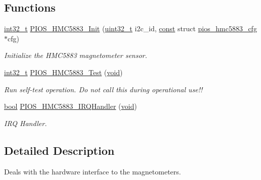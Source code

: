 \subsection*{Functions}
\begin{DoxyCompactItemize}
\item 
\hyperlink{group___n_a_m_e_gafd12020da5a235dfcf0c3c748fb5baed}{int32\-\_\-t} \hyperlink{group___p_i_o_s___h_m_c5883_ga2de33c0ac02b42cb114d9af689101498}{P\-I\-O\-S\-\_\-\-H\-M\-C5883\-\_\-\-Init} (\hyperlink{stdint_8h_a435d1572bf3f880d55459d9805097f62}{uint32\-\_\-t} i2c\-\_\-id, \hyperlink{group___n_a_m_e_ga7ae6d0e43244213b34de2c2b9aa30da6}{const} struct \hyperlink{structpios__hmc5883__cfg}{pios\-\_\-hmc5883\-\_\-cfg} $\ast$cfg)
\begin{DoxyCompactList}\small\item\em Initialize the H\-M\-C5883 magnetometer sensor. \end{DoxyCompactList}\item 
\hyperlink{group___n_a_m_e_gafd12020da5a235dfcf0c3c748fb5baed}{int32\-\_\-t} \hyperlink{group___p_i_o_s___h_m_c5883_gacea6145300c5c975b46bca1acfe800bf}{P\-I\-O\-S\-\_\-\-H\-M\-C5883\-\_\-\-Test} (\hyperlink{group___n_a_m_e_ga18028b8badbf1ea7e704ccac3c488e82}{void})
\begin{DoxyCompactList}\small\item\em Run self-\/test operation. Do not call this during operational use!! \end{DoxyCompactList}\item 
\hyperlink{group___exported__types_gaf6a258d8f3ee5206d682d799316314b1}{bool} \hyperlink{group___p_i_o_s___h_m_c5883_ga418c7eecd061766bac016b522b593fc2}{P\-I\-O\-S\-\_\-\-H\-M\-C5883\-\_\-\-I\-R\-Q\-Handler} (\hyperlink{group___n_a_m_e_ga18028b8badbf1ea7e704ccac3c488e82}{void})
\begin{DoxyCompactList}\small\item\em I\-R\-Q Handler. \end{DoxyCompactList}\end{DoxyCompactItemize}


\subsection{Detailed Description}
Deals with the hardware interface to the magnetometers. 

